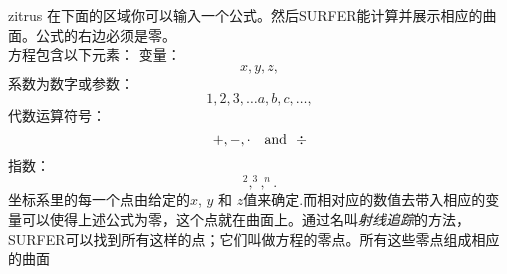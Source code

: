 ﻿\begin{surferPage}{zitrus}
在下面的区域你可以输入一个公式。然后SURFER能计算并展示相应的曲面。公式的右边必须是零。
\\
方程包含以下元素：
\newline
变量：
\[x, y, z, \]
系数为数字或参数：
\[1, 2, 3, \dots a, b, c, \dots, \]
代数运算符号：
\[+,  - , \cdot \quad \textnormal{and}\ \ \div\]
指数：
\[ ^2, ^3, ^n .\]
坐标系里的每一个点由给定的$x$, $y$ 和 $z$值来确定.而相对应的数值去带入相应的变量可以使得上述公式为零，这个点就在曲面上。通过名叫\textit{射线追踪}的方法，SURFER可以找到所有这样的点；它们叫做方程的零点。所有这些零点组成相应的曲面
\end{surferPage}
